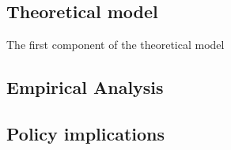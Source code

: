 \documentclass[american]{scrartcl}
\begin{document}
\subsection{Theoretical model}


The first component of the theoretical model 


\subsection{Empirical Analysis}

\subsection{Policy implications}

\newpage

\printbibliography
\end{document}
